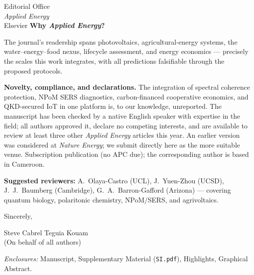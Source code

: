 \documentclass[10pt]{letter}
\begin{document}
\begin{letter}{Editorial Office\\
\textit{Applied Energy}\\
Elsevier}
\noindent\textbf{Why \textit{Applied Energy}?}

The journal's readership spans photovoltaics, agricultural-energy systems, the water--energy--food nexus, lifecycle assessment, and energy economics --- precisely the scales this work integrates, with all predictions falsifiable through the proposed protocols.

\noindent\textbf{Novelty, compliance, and declarations.} The integration of spectral coherence protection, NPoM SERS diagnostics, carbon-financed cooperative economics, and QKD-secured IoT in one platform is, to our knowledge, unreported. The manuscript has been checked by a native English speaker with expertise in the field; all authors approved it, declare no competing interests, and are available to review at least three other \textit{Applied Energy} articles this year. An earlier version was considered at \textit{Nature Energy}; we submit directly here as the more suitable venue. Subscription publication (no APC due); the corresponding author is based in Cameroon.

\noindent\textbf{Suggested reviewers:} A.~Olaya-Castro (UCL), J.~Yuen-Zhou (UCSD), J.~J.~Baumberg (Cambridge), G.~A.~Barron-Gafford (Arizona) --- covering quantum biology, polaritonic chemistry, NPoM/SERS, and agrivoltaics.

\bigskip
Sincerely,

Steve Cabrel Teguia Kouam\\
(On behalf of all authors)

\vspace{-0.6em}
\textit{Enclosures:} Manuscript, Supplementary Material (\texttt{SI.pdf}), Highlights, Graphical Abstract.

\end{letter}
\end{document}
